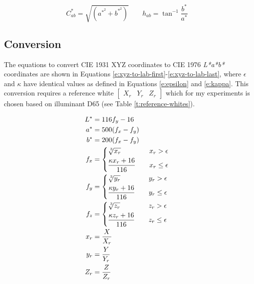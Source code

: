 \begin{equation}
C^*_{ab} = \sqrt{\left(a^{*^2} + b^{*^2} \right)} \qquad h_{ab} = \tan^{-1} \frac{b^*}{a^*}
\label{e:lab-chroma-hue}
\end{equation}

\subsection{Conversion}

The equations to convert CIE 1931 XYZ coordinates to CIE 1976
\emph{L*a*b*} coordinates are shown in Equations
\ref{e:xyz-to-lab-first}-\ref{e:xyz-to-lab-last}, where $\epsilon$ and
$\kappa$ have identical values as defined in Equations \ref{e:epsilon}
and \ref{e:kappa}. This conversion requires a reference white
$\begin{bmatrix}X_r & Y_r & Z_r\end{bmatrix}$ which for my experiments
is chosen based on illuminant D65 (see Table
\ref{t:reference-whites}).

\begin{align}
L^{*}& = 116f_y - 16
\label{e:xyz-to-lab-first} \\
a^{*}& = 500(f_x - f_y) \\
b^{*}& = 200(f_x - f_y) \\
f_x& = \left\{
\begin{aligned}
&\sqrt[\leftroot{-1}\uproot{2}3]{x_r} & \quad x_r > \epsilon \\
&\frac{\kappa x_r + 16}{116} & \quad x_r \leq \epsilon
\end{aligned}
\right. \\
f_y& = \left\{
\begin{aligned}
&\sqrt[\leftroot{-1}\uproot{2}3]{y_r} & \quad y_r > \epsilon \\
&\frac{\kappa y_r + 16}{116} & \quad y_r \leq \epsilon
\end{aligned}
\right. \\
f_z& = \left\{
\begin{aligned}
&\sqrt[\leftroot{-1}\uproot{2}3]{z_r} & \quad z_r > \epsilon \\
&\frac{\kappa z_r + 16}{116} & \quad z_r \leq \epsilon
\end{aligned}
\right. \\
x_r& = \frac{X}{X_r} \\
y_r& = \frac{Y}{Y_r} \\
Z_r& = \frac{Z}{Z_r}
\label{e:xyz-to-lab-last}
\end{align}

